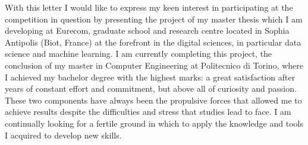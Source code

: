 \documentclass[11pt, a4paper]{dogear-cv}
\begin{document}
\makecvheader[L]


\makelettertitle

\begin{cvletter}

  
With this letter I would like to express my keen interest in participating at the competition in question by presenting the project of my master thesis which I am developing at Eurecom, graduate school and research centre located in Sophia Antipolis (Biot, France) at the forefront in the digital sciences, in particular data science and machine learning. 
I am currently completing this project, the conclusion of my master in Computer Engineering at Politecnico di Torino, where I achieved my bachelor degree with the highest marks: a great satisfaction after years of constant effort and commitment, but above all of curiosity and passion.
These two components have always been the propulsive forces that allowed me to achieve results despite the difficulties and stress that studies lead to face. I am continually looking for a fertile ground in which to apply the knowledge and tools I acquired to develop new skills.
  

\end{cvletter}
\end{document}
